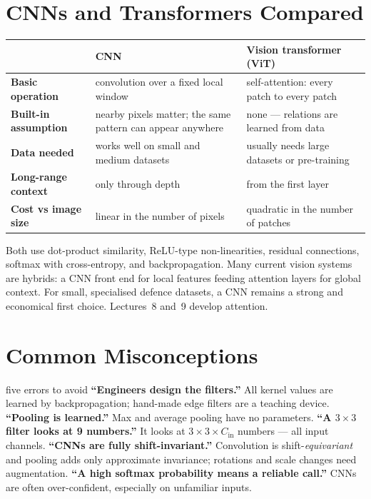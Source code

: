 \documentclass[11pt]{article}
\begin{document}
\section{CNNs and Transformers Compared}
\begin{center}\small\renewcommand{\arraystretch}{1.3}
\begin{tabularx}{\textwidth}{@{}>{\bfseries}p{3.2cm} X X@{}}\toprule
& \textbf{CNN} & \textbf{Vision transformer (ViT)}\\\midrule
Basic operation & convolution over a fixed local window & self-attention: every patch to every patch\\
Built-in assumption & nearby pixels matter; the same pattern can appear anywhere & none --- relations are learned from data\\
Data needed & works well on small and medium datasets & usually needs large datasets or pre-training\\
Long-range context & only through depth & from the first layer\\
Cost vs image size & linear in the number of pixels & quadratic in the number of patches\\\bottomrule
\end{tabularx}\end{center}
Both use dot-product similarity, ReLU-type non-linearities, residual connections, softmax with cross-entropy, and backpropagation. Many current vision systems are hybrids: a CNN front end for local features feeding attention layers for global context. For small, specialised defence datasets, a CNN remains a strong and economical first choice. Lectures~8 and~9 develop attention.

\section{Common Misconceptions}
\begin{pitfall}{five errors to avoid}
\textbf{``Engineers design the filters.''} All kernel values are learned by backpropagation; hand-made edge filters are a teaching device.
\textbf{``Pooling is learned.''} Max and average pooling have no parameters.
\textbf{``A $3\times3$ filter looks at 9 numbers.''} It looks at $3\times3\times C_{\text{in}}$ numbers --- all input channels.
\textbf{``CNNs are fully shift-invariant.''} Convolution is shift-\emph{equivariant} and pooling adds only approximate invariance; rotations and scale changes need augmentation.
\textbf{``A high softmax probability means a reliable call.''} CNNs are often over-confident, especially on unfamiliar inputs.
\end{pitfall}
\end{document}
